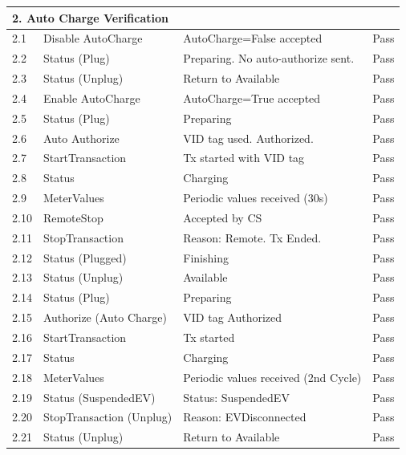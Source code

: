 \documentclass[a4paper,11pt]{report}
\begin{document}
\begin{footnotesize}
\begin{footnotesize}
\begin{longtable}{|p{1.0cm}|p{4.5cm}|p{6.5cm}|c|}
\multicolumn{4}{|l|}{\textbf{2. Auto Charge Verification}} \\
\hline
2.1 & Disable AutoCharge & AutoCharge=False accepted & Pass \\
\hline
2.2 & Status (Plug) & Preparing. No auto-authorize sent. & Pass \\
\hline
2.3 & Status (Unplug) & Return to Available & Pass \\
\hline
2.4 & Enable AutoCharge & AutoCharge=True accepted & Pass \\
\hline
2.5 & Status (Plug) & Preparing & Pass \\
\hline
2.6 & Auto Authorize & VID tag used. Authorized. & Pass \\
\hline
2.7 & StartTransaction & Tx started with VID tag & Pass \\
\hline
2.8 & Status & Charging & Pass \\
\hline
2.9 & MeterValues & Periodic values received (30s) & Pass \\
\hline
2.10 & RemoteStop & Accepted by CS & Pass \\
\hline
2.11 & StopTransaction & Reason: Remote. Tx Ended. & Pass \\
\hline
2.12 & Status (Plugged) & Finishing & Pass \\
\hline
2.13 & Status (Unplug) & Available & Pass \\
\hline
2.14 & Status (Plug) & Preparing & Pass \\
\hline
2.15 & Authorize (Auto Charge) & VID tag Authorized & Pass \\
\hline
2.16 & StartTransaction & Tx started & Pass \\
\hline
2.17 & Status & Charging & Pass \\
\hline
2.18 & MeterValues & Periodic values received (2nd Cycle) & Pass \\
\hline
2.19 & Status (SuspendedEV) & Status: SuspendedEV & Pass \\
\hline
2.20 & StopTransaction (Unplug) & Reason: EVDisconnected & Pass \\
\hline
2.21 & Status (Unplug) & Return to Available & Pass \\
\hline


\end{longtable}
\end{footnotesize}
\end{footnotesize}
\end{document}
